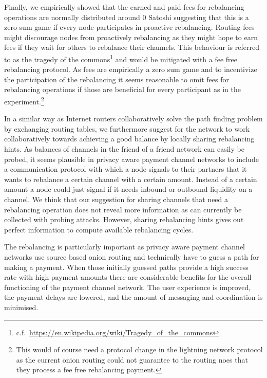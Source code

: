 \documentclass[conference]{IEEEtran}
\begin{document}
Finally, we empirically showed that the earned and paid fees for rebalancing operations are normally distributed around $0$ Satoshi suggesting that this is a zero sum game if every node participates in proactive rebalancing.
Routing fees might discourage nodes from proactively rebalancing as they might hope to earn fees if they wait for others to rebalance their channels.
This behaviour is referred to as the tragedy of the commons\footnote{c.f.~\url{https://en.wikipedia.org/wiki/Tragedy_of_the_commons}} and would be mitigated with a fee free rebalancing protocol.
As fees are empirically a zero sum game and to incentivize the participation of the rebalancing it seems reasonable to omit fees for rebalancing operations if those are beneficial for every participant as in the experiment.\footnote{This would of course need a protocol change in the lightning network protocol as the current onion routing could not guarantee to the routing noes that they process a fee free rebalancing payment.}

In a similar way as Internet routers collaboratively solve the path finding problem by exchanging routing tables, we furthermore suggest for the network to work collaboratively towards achieving a good balance by locally sharing rebalancing hints. 
As balances of channels in the friend of a friend network can easily be probed, it seems plausible in privacy aware payment channel networks to include a communication protocol with which a node signals to their partners that it wants to rebalance a certain channel with a certain amount.
Instead of a certain amount a node could just signal if it needs inbound or outbound liquidity on a channel. 
We think that our suggestion for sharing channels that need a rebalancing operation does not reveal more information as can currently be collected with probing attacks.
However, sharing rebalancing hints gives out perfect information to compute available rebalancing cycles.

The rebalancing is particularly important as privacy aware payment channel networks use source based onion routing and technically have to guess a path for making a payment.
When those initially guessed paths provide a high success rate with high payment amounts there are considerable benefits for the overall functioning of the payment channel network. 
The user experience is improved, the payment delays are lowered, and the amount of messaging and coordination is minimised.



\end{document}
